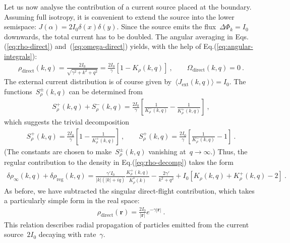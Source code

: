 \documentclass[preprint,aps,eqsecnum]{revtex4-1}
\newcommand{\fplus}[1]{{#1}^{+}}
\newcommand{\fminus}[1]{{#1}^{-}}
\newcommand{\fplusminus}[1]{{#1}^{\pm}}
\newcommand{\dct}[1]{{#1}_\mathrm{direct}}
\begin{document}
Let us now analyse the contribution of a current source placed at the boundary.
Assuming full isotropy, it is convenient to
extend the source into the lower semispace:
$J(\alpha) = 2I_0 \delta(x) \delta(y)$. Since the source
emits the flux~$\Delta \Phi_k = I_0$ downwards, the total
current has to be doubled.
The angular averaging in Eqs.(\ref{eq:rho-direct}) and~(\ref{eq:omega-direct})
yields, with the help of Eq.(\ref{eq:angular-integrals}):
\begin{align}
  \dct{\rho}(k, q) = \frac{2I_0}{\sqrt{\gamma^2 + k^2 + q^2}} = 
  \frac{2I_0}{\gamma} \left[1 - K_\rho(k, q)\right]\ ,
  \qquad
  \dct{\Omega}(k, q) = 0\ .
\end{align}
The external current distribution is of course
given by~$\langle J_\mathrm{ext}(k, q) \rangle = I_0$.
The functions~$\fplusminus{S}_\rho(k, q)$ can be determined from
\begin{align}
    \fplus{S}_\rho(k, q)
 +  \fminus{S}_\rho(k, q)
  = \frac{2I_0}{\gamma} \left[\frac{1}{\fminus{K}_\rho(k, q)}
  - \frac{1}{\fplus{K}_\rho(k, q)}\right]\ , 
\end{align}
which suggests the trivial decomposition
\begin{align}
  \fplus{S}_\rho(k, q) = \frac{2I_0}{\gamma}
  \left[1 - \frac{1}{\fplus{K}_\rho(k, q)}\right]\ ,
  \qquad
  \fplus{S}_\rho(k, q) = \frac{2I_0}{\gamma}
  \left[\frac{1}{\fminus{K}_\rho(k, q)} - 1\right]\ .
\end{align}
(The constants are chosen to make~$\fplusminus{S}_\rho(k, q)$
vanishing at~$q\to\infty$.) Thus, the regular contribution
to the density in Eq.(\ref{eq:rho-decomp}) takes the form
\begin{align}
  \delta\rho_\infty(k, q) + \delta\rho_\mathrm{reg}(k, q) =
  \frac{\gamma' I_0}{|k|(|k| + iq)} \frac{\fplus{K}_\rho(k, q)}{
  K^\ast_{\rho}(k)}
  - \frac{2\gamma'}{k^2 + q^2} 
  + I_0 \left[K_\rho(k, q) + \fplus{K}_\rho(k, q) - 2\right] \ . 
\end{align}
As before, we have subtracted the singular direct-flight contribution,
which takes a particularly simple form in the real space:
\begin{align}
  \dct{\rho}({\bm r}) = \frac{2I_0}{|{\bm r}|} e^{-\gamma |{\bm r}|}\ .
\end{align}
This relation describes radial propagation of particles emitted from
the current source~$2I_0$ decaying with rate~$\gamma$.
\end{document}
